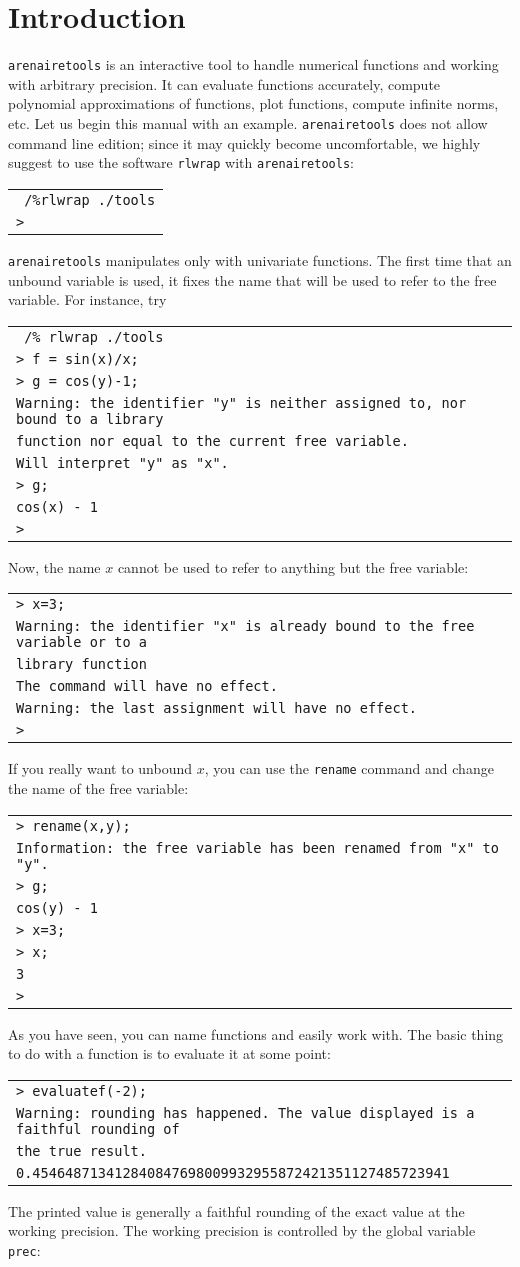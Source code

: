 \documentclass[a4paper]{article}
\newcommand{\com}[1]{\texttt{#1}}
\newcommand{\arenairetools}{\texttt{arenairetools}\xspace}
\newcommand{\rlwrap}{\texttt{rlwrap}\xspace}
\newcommand{\code}[1]{\begin{center}
\begin{tabular}{|p{14.8cm}|}
\hline
#1
\hline
\end{tabular}
\end{center}
}
\newcommand{\ligne}[1]{\texttt{#1}\\}
\begin{document}
\section{Introduction}
\arenairetools is an interactive tool to handle numerical functions and working with arbitrary precision. It can evaluate functions accurately, compute polynomial approximations of functions, plot functions, compute infinite norms, etc. Let us begin this manual with an example. \arenairetools does not allow command line edition; since it may quickly become uncomfortable, we highly suggest to use the software \rlwrap with \arenairetools:

\code{
\ligne{~/\%rlwrap ./tools}
\ligne{>}
}

\arenairetools manipulates only with univariate functions. The first time that an unbound variable is used, it fixes the name that will be used to refer to the free variable. For instance, try

\code{
\ligne{~/\% rlwrap ./tools}
\ligne{> f = sin(x)/x;}
\ligne{> g = cos(y)-1;}
\ligne{Warning: the identifier "y" is neither assigned to, nor bound to a library }
\ligne{function nor equal to the current free variable.}
\ligne{Will interpret "y" as "x".}
\ligne{> g;}
\ligne{cos(x) - 1}
\ligne{>} 
}

Now, the name $x$ cannot be used to refer to anything but the free variable:

\code{
\ligne{> x=3;}
\ligne{Warning: the identifier "x" is already bound to the free variable or to a }
\ligne{library function}
\ligne{The command will have no effect.}
\ligne{Warning: the last assignment will have no effect.}
\ligne{>}
}

If you really want to unbound $x$, you can use the \com{rename} command and change the name of the free variable:

\code{
\ligne{> rename(x,y);}
\ligne{Information: the free variable has been renamed from "x" to "y".}
\ligne{> g;}
\ligne{cos(y) - 1}
\ligne{> x=3;}
\ligne{> x;}
\ligne{3}
\ligne{> }
}

As you have seen, you can name functions and easily work with. The basic thing to do with a function is to evaluate it at some point:

\code{
\ligne{> evaluatef(-2);}
\ligne{Warning: rounding has happened. The value displayed is a faithful rounding of }
\ligne{the true result.}
\ligne{0.454648713412840847698009932955872421351127485723941}
}

The printed value is generally a faithful rounding of the exact value at the working precision. The working precision is controlled by the global variable \com{prec}:
\end{document}
